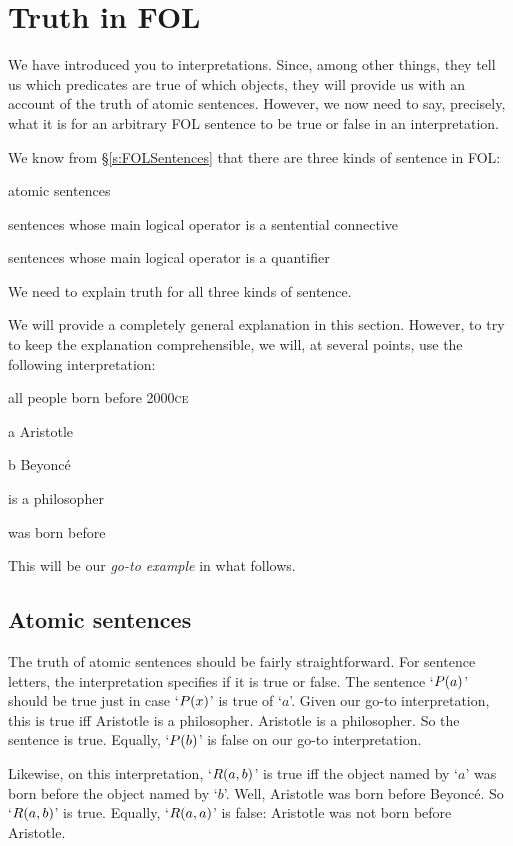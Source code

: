 \chapter{Truth in FOL}\label{s:TruthFOL}
We have introduced you to interpretations. Since, among other things, they tell us which predicates are true of which objects, they will provide us with an account of the truth of atomic sentences. However, we now need to say, precisely, what it is for an arbitrary FOL sentence to be true or false in an interpretation. 

We know from \S\ref{s:FOLSentences} that there are three kinds of sentence in FOL: 
	\begin{ebullet}
		\item atomic sentences
		\item sentences whose main logical operator is a sentential connective
		\item sentences whose main logical operator is a quantifier
	\end{ebullet}
We need to explain truth for all three kinds of sentence.

We will provide a completely general explanation in this section. However, to try to keep the explanation comprehensible, we will, at several points, use the following interpretation:
	\begin{ekey}
		\item[\text{domain}] all people born before 2000\textsc{ce}
		\item[a] Aristotle
		\item[b] Beyonc\'e
		\item[\atom{P}{x}]  is a philosopher
		\item[\atom{R}{x,y}]  was born before 
	\end{ekey}
This will be our \emph{go-to example} in what follows.

\section{Atomic sentences}
The truth of atomic sentences should be fairly straightforward. For sentence letters, the interpretation specifies if it is true or false. The sentence `$\mathord{P}(a)$' should be true just in case `$\mathord{P}(x)$' is true of `$a$'. Given our go-to interpretation, this is true iff Aristotle is a philosopher. Aristotle is a philosopher. So the sentence is true. Equally, `$\mathord{P}(b)$' is false on our go-to interpretation.

Likewise, on this interpretation, `$\mathord{R}(a,b)$' is true iff the object named by `$a$' was born before the object named by `$b$'. Well, Aristotle was born before Beyonc\'e. So `$\mathord{R}(a,b)$' is true. Equally, `$\mathord{R}(a,a)$' is false: Aristotle was not born before Aristotle. 

